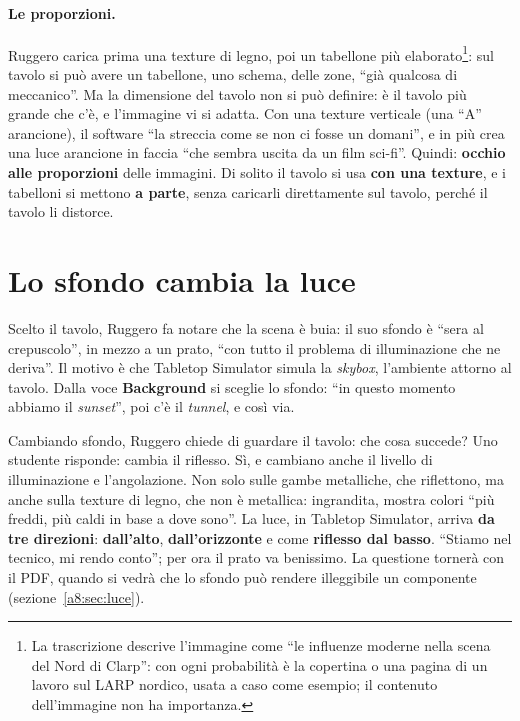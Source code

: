 \paragraph{Le proporzioni.} Ruggero carica prima una texture di legno, poi un
tabellone più elaborato\footnote{La trascrizione descrive l'immagine come ``le
influenze moderne nella scena del Nord di Clarp'': con ogni probabilità è la
copertina o una pagina di un lavoro sul LARP nordico, usata a caso come esempio; il
contenuto dell'immagine non ha importanza.}: sul tavolo si può avere un tabellone,
uno schema, delle zone, ``già qualcosa di meccanico''. Ma la dimensione del tavolo non
si può definire: è il tavolo più grande che c'è, e l'immagine vi si adatta. Con una
texture verticale (una ``A'' arancione), il software ``la streccia come se non ci fosse
un domani'', e in più crea una luce arancione in faccia ``che sembra uscita da un film
sci-fi''. Quindi: \textbf{occhio alle proporzioni} delle immagini. Di solito il tavolo
si usa \textbf{con una texture}, e i tabelloni si mettono \textbf{a parte}, senza
caricarli direttamente sul tavolo, perché il tavolo li distorce.

\section{Lo sfondo cambia la luce}
\label{a8:sec:sfondi}

Scelto il tavolo, Ruggero fa notare che la scena è buia: il suo sfondo è ``sera al
crepuscolo'', in mezzo a un prato, ``con tutto il problema di illuminazione che ne
deriva''. Il motivo è che Tabletop Simulator simula la \emph{skybox}, l'ambiente
attorno al tavolo. Dalla voce \textbf{Background} si sceglie lo sfondo: ``in questo
momento abbiamo il \emph{sunset}'', poi c'è il \emph{tunnel}, e così via.

Cambiando sfondo, Ruggero chiede di guardare il tavolo: che cosa succede? Uno studente
risponde: cambia il riflesso. Sì, e cambiano anche il livello di illuminazione e
l'angolazione. Non solo sulle gambe metalliche, che riflettono, ma anche sulla texture
di legno, che non è metallica: ingrandita, mostra colori ``più freddi, più caldi in base
a dove sono''. La luce, in Tabletop Simulator, arriva \textbf{da tre direzioni}:
\textbf{dall'alto}, \textbf{dall'orizzonte} e come \textbf{riflesso dal basso}. ``Stiamo
nel tecnico, mi rendo conto''; per ora il prato va benissimo. La questione tornerà con
il PDF, quando si vedrà che lo sfondo può rendere illeggibile un componente
(sezione~\ref{a8:sec:luce}).

